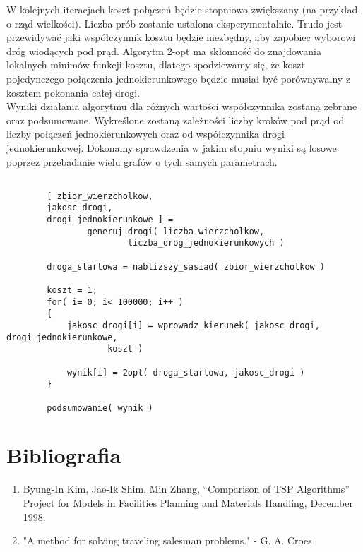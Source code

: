 \documentclass{article}
\begin{document}
W kolejnych iteracjach koszt połączeń będzie stopniowo zwiększany (na przykład o rząd wielkości). Liczba prób zostanie ustalona eksperymentalnie. Trudo jest przewidywać jaki współczynnik kosztu będzie niezbędny, aby zapobiec wyborowi dróg wiodących pod prąd. Algorytm 2-opt ma skłonność do znajdowania lokalnych minimów funkcji kosztu, dlatego spodziewamy się, że koszt pojedynczego połączenia jednokierunkowego będzie musiał być porównywalny z kosztem pokonania całej drogi. \\

Wyniki działania algorytmu dla różnych wartości współczynnika zostaną zebrane oraz podsumowane. Wykreślone zostaną zależności liczby kroków pod prąd od liczby połączeń jednokierunkowych oraz od współczynnika drogi jednokierunkowej. Dokonamy sprawdzenia w jakim stopniu wyniki są losowe poprzez przebadanie wielu grafów o tych samych parametrach. \\

\newpage
\begin{lstlisting}[caption={Funkcja testująca algorytm}]

		[ zbior_wierzcholkow, 
		jakosc_drogi, 
		drogi_jednokierunkowe ] = 
				generuj_drogi( liczba_wierzcholkow, 
						liczba_drog_jednokierunkowych )
		
		droga_startowa = nablizszy_sasiad( zbior_wierzcholkow )
		
		koszt = 1;
		for( i= 0; i< 100000; i++ )
		{
			jakosc_drogi[i] = wprowadz_kierunek( jakosc_drogi, drogi_jednokierunkowe,
					koszt )
			
			wynik[i] = 2opt( droga_startowa, jakosc_drogi )
		}
		
		podsumowanie( wynik )

\end{lstlisting}


\section{Bibliografia}


\begin{enumerate}
\item Byung-In Kim, Jae-Ik Shim, Min Zhang, “Comparison of TSP Algorithms” Project for Models in Facilities Planning and Materials Handling, December 1998. %
\item "A method for solving traveling salesman problems." - G. A. Croes
\end{enumerate}
\end{document}
